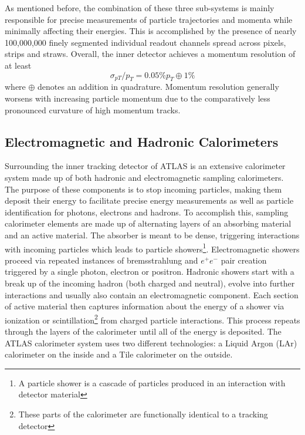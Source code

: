 As mentioned before, the combination of these three sub-systems is mainly responsible for precise measurements of 
particle trajectories and momenta while minimally affecting their energies. This is accomplished by the presence of 
nearly 100,000,000 finely segmented individual readout channels spread across pixels, strips and straws. Overall, the 
inner detector achieves a momentum resolution of at least
\begin{equation}
\sigma_{pT}/p_T = 0.05\% p_T \oplus 1\%
\end{equation}
where $\oplus$ denotes an addition in quadrature. Momentum resolution generally worsens with increasing particle 
momentum due to the comparatively less pronounced curvature of high momentum tracks.

\subsection{Electromagnetic and Hadronic Calorimeters}

Surrounding the inner tracking detector of ATLAS is an extensive calorimeter system made up of both hadronic and 
electromagnetic sampling calorimeters. The purpose of these components is to stop incoming particles, making them 
deposit their energy to facilitate precise energy measurements as well as particle identification for photons, 
electrons and hadrons. To accomplish this, sampling calorimeter elements are made up of alternating layers of an 
absorbing material and an active material. The absorber is meant to be dense, triggering interactions with incoming 
particles which leads to particle showers\footnote{A particle shower is a cascade of particles produced in an 
interaction with detector material}. Electromagnetic showers proceed via repeated instances of bremsstrahlung and 
$e^+e^-$ pair creation triggered by a single photon, electron or positron. Hadronic showers start with a break up of 
the incoming hadron (both charged and neutral), evolve into further interactions and usually also contain an 
electromagnetic component. Each section of active material then captures information about the energy of a shower 
via ionization or scintillation\footnote{These parts of the calorimeter are functionally identical to a tracking 
detector} from charged particle interactions. This process repeats through the layers of the calorimeter until all of 
the energy is deposited. The ATLAS calorimeter system uses two different technologies: a Liquid Argon (LAr) 
calorimeter on the inside and a Tile calorimeter on the outside. \par

